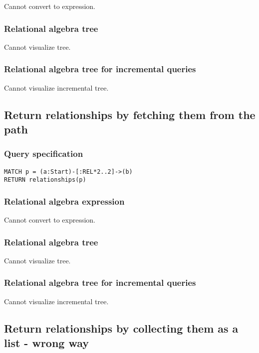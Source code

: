 Cannot convert to expression.

\subsubsection*{Relational algebra tree}

Cannot visualize tree.

\subsubsection*{Relational algebra tree for incremental queries}

Cannot visualize incremental tree.

\subsection{Return relationships by fetching them from the path}

\subsubsection*{Query specification}

\begin{lstlisting}
MATCH p = (a:Start)-[:REL*2..2]->(b)
RETURN relationships(p)
\end{lstlisting}

\subsubsection*{Relational algebra expression}

Cannot convert to expression.

\subsubsection*{Relational algebra tree}

Cannot visualize tree.

\subsubsection*{Relational algebra tree for incremental queries}

Cannot visualize incremental tree.

\subsection{Return relationships by collecting them as a list - wrong way}

